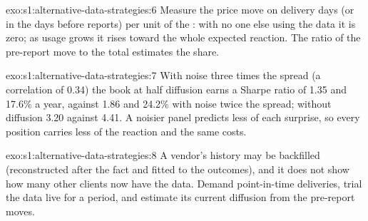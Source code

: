 \begin{solution}{exo:s1:alternative-data-strategies:6}
Measure the price move on delivery days (or in the days before reports) per unit of the : with no one else using the data it is zero; as usage
grows it rises toward the whole expected reaction. The ratio of the pre-report move to the total estimates the share.
\end{solution}

\begin{solution}{exo:s1:alternative-data-strategies:7}
With noise three times the spread (a correlation of 0.34) the book at half diffusion earns a Sharpe ratio of 1.35 and 17.6\% a year, against 1.86 and 24.2\% with
noise twice the spread; without diffusion 3.20 against 4.41. A noisier panel predicts less of each surprise, so every position carries less of the reaction
and the same costs.
\end{solution}

\begin{solution}{exo:s1:alternative-data-strategies:8}
A vendor's history may be backfilled (reconstructed after the fact and fitted to the outcomes), and it does not show how many other clients now have the
data. Demand point-in-time deliveries, trial the data live for a period, and estimate its current diffusion from the pre-report moves.
\end{solution}

